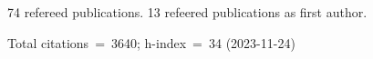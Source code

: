 74 refereed publications. 13 refeered publications as first author.

Total citations~=~3640; h-index~=~34 (2023-11-24)